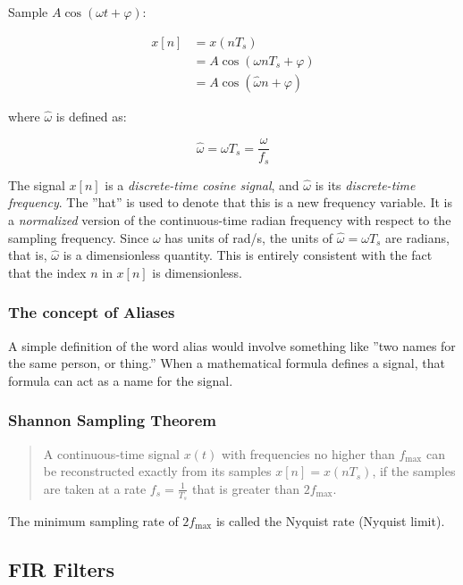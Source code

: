 \documentclass[11pt]{article}
\begin{document}
Sample $A \cos (\omega t + \varphi)$:

\begin{align}
  x[n] &= x(nT_s) \\
       &= A \cos (\omega n T_s + \varphi) \\
       &= A \cos (\hat{\omega} n + \varphi)
\end{align}

where $\hat{\omega}$ is defined as:

\begin{equation}
\hat{\omega} = \omega T_s = \frac{\omega}{f_s}
\end{equation}

The signal $x[n]$ is a \emph{discrete-time cosine signal}, and $\hat{\omega}$ is
its \emph{discrete-time frequency}. The ''hat'' is used to denote that this is a
new frequency variable. It is a \emph{normalized} version of the continuous-time
radian frequency with respect to the sampling frequency. Since $\omega$ has
units of rad/s, the units of $\hat{\omega} = \omega T_s$ are radians, that is,
$\hat{\omega}$ is a dimensionless quantity. This is entirely consistent with the
fact that the index $n$ in $x[n]$ is dimensionless.

\subsubsection{The concept of Aliases}

A simple definition of the word alias would involve something like ''two names
for the same person, or thing.'' When a mathematical formula defines a signal,
that formula can act as a name for the signal.

\subsubsection{Shannon Sampling Theorem}

\begin{quote}
  A continuous-time signal $x(t)$ with frequencies no higher than
  $f_{\mathrm{max}}$ can be reconstructed exactly from its samples
  $x[n] = x(nT_s)$, if the samples are taken at a rate $f_s = \frac{1}{T_s}$
  that is greater than $2f_{\mathrm{max}}$.
\end{quote}

The minimum sampling rate of $2f_{\mathrm{max}}$ is called the Nyquist rate
(Nyquist limit).

\subsection{FIR Filters}
\end{document}
